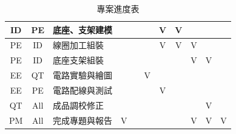 \documentclass[12pt,a4paper]{article}
\begin{document}
\begin{CJK*}{UTF8}{bkai}
\begin{table}[H]
\begin{center}
{\begin{tabularx}{\textwidth}{|c|c|Y|c|c|c|c|c|c|c|c|}
                    \hline
                    ID & PE  & 底座、支架建模 &      &       &       & V     & V    &       &       &       \\
                    \hline
                    PE & ID  & 線圈加工組裝  &      &       &       & V     & V    & V     &       &       \\
                    \hline
                    PE & ID  & 底座支架組裝  &      &       &       &       &      & V     & V     &       \\
                    \hline
                    EE & QT  & 電路實驗與繪圖 &      &       & V     &       &      &       &       &       \\
                    \hline
                    EE & PE  & 電路配線與測試 &      &       &       & V     &      &       &       &       \\
                    \hline
                    QT & All & 成品調校修正  &      &       &       &       &      &       & V     &       \\
                    \hline
                    PM & All & 完成專題與報告 & V    &       &       &       &      & V     & V     & V     \\
                    \hline
                \end{tabularx}}
            \caption{專案進度表}
            \vspace{-1.5cm}
        \end{center}
    \end{table}

\end{CJK*}
\end{document}
